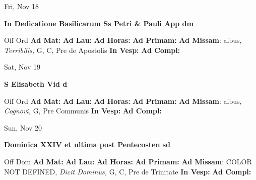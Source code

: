 \documentclass[10pt]{memoir}
\begin{document}
\begin{center}
\begin{minipage}{3.5in}
\vspace{2em}
\begin{center}Fri, Nov 18
\end{center}
\textbf{ \large In Dedicatione Basilicarum Ss Petri \& Pauli App
\textnormal{\normalsize dm}}

\begin{justify}Off Ord
\textbf{Ad Mat: }
\textbf{Ad Lau: }
\textbf{Ad Horas: }
\textbf{Ad Primam: }\textbf{Ad Missam}: albus, \textit{Terribilis,} G, C, Pre de Apostolis
\textbf{In Vesp: }
\textbf{Ad Compl: }
\end{justify}
\end{minipage}
\end{center}

\begin{center}
\begin{minipage}{3.5in}
\vspace{2em}
\begin{center}Sat, Nov 19
\end{center}
\textbf{ \large S Elisabeth Vid
\textnormal{\normalsize d}}

\begin{justify}Off Ord
\textbf{Ad Mat: }
\textbf{Ad Lau: }
\textbf{Ad Horas: }
\textbf{Ad Primam: }\textbf{Ad Missam}: albus, \textit{Cognovi,} G, Pre Communis
\textbf{In Vesp: }
\textbf{Ad Compl: }
\end{justify}
\end{minipage}
\end{center}

\begin{center}
\begin{minipage}{3.5in}
\vspace{2em}
\begin{center}Sun, Nov 20
\end{center}
\textbf{ \large Dominica XXIV et ultima post Pentecosten
\textnormal{\normalsize sd}}

\begin{justify}Off Dom
\textbf{Ad Mat: }
\textbf{Ad Lau: }
\textbf{Ad Horas: }
\textbf{Ad Primam: }\textbf{Ad Missam}: COLOR NOT DEFINED, \textit{Dicit Dominus,} G, C, Pre de Trinitate
\textbf{In Vesp: }
\textbf{Ad Compl: }
\end{justify}
\end{minipage}
\end{center}
\end{document}
